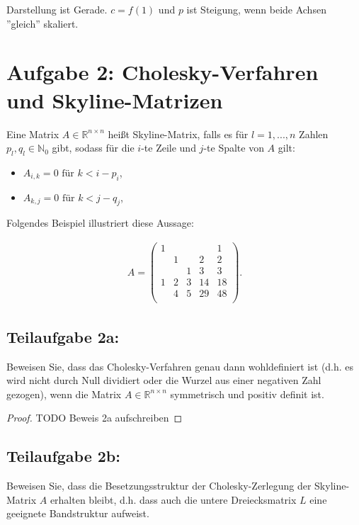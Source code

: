 \documentclass[]{article}
\begin{document}
Darstellung ist Gerade. $c = f(1)$ und $p$ ist Steigung, wenn beide Achsen ''gleich'' skaliert.

\section*{Aufgabe 2: Cholesky-Verfahren und Skyline-Matrizen}
Eine Matrix $A \in \mathbb{R}^{n\times n}$ heißt Skyline-Matrix, falls es für $l = 1, ..., n$ Zahlen $p_l, q_l \in \mathbb{N}_0$ gibt, sodass für die $i$-te Zeile und $j$-te Spalte von $A$ gilt:

\begin{itemize}
	\item $A_{i,k} = 0 \text{ für } k < i - p_i$,
	\item $A_{k,j} = 0 \text{ für } k < j - q_j$,
\end{itemize}

Folgendes Beispiel illustriert diese Aussage:

\begin{align*}
	A = \begin{pmatrix}
		1 &   &   &   & 1 \\
		  & 1 &   & 2 & 2 \\
		  &   & 1 & 3 & 3 \\
		1 & 2 & 3 &14 &18 \\
		  & 4 & 5 &29 &48 \\
	\end{pmatrix}.
\end{align*}

\subsection*{Teilaufgabe 2a:}
Beweisen Sie, dass das Cholesky-Verfahren genau dann wohldefiniert ist (d.h. es wird nicht durch Null dividiert oder die Wurzel aus einer negativen Zahl gezogen), wenn die Matrix $A \in \mathbb{R}^{n\times n}$ symmetrisch und positiv definit ist.

\begin{proof}
	TODO Beweis 2a aufschreiben
\end{proof}

\subsection*{Teilaufgabe 2b:}
Beweisen Sie, dass die Besetzungsstruktur der Cholesky-Zerlegung der Skyline-Matrix $A$ erhalten bleibt, d.h. dass auch die untere Dreiecksmatrix $L$ eine geeignete Bandstruktur aufweist.
\end{document}
